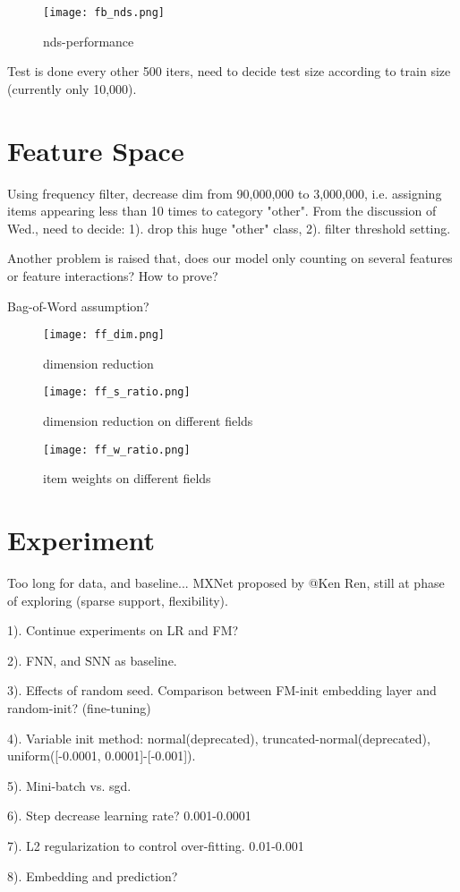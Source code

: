 \documentclass[
  oneside,
  11pt, a4paper,
  footinclude=false,
  headinclude=false,
]{scrbook}
\begin{document}
\begin{figure}[h]
    \centering
    \texttt{[image: fb\_nds.png]}
    \caption{nds-performance}
\end{figure}

Test is done every other 500 iters, need to decide test size according to train size (currently only 10,000). 

\section{Feature Space}

Using frequency filter, decrease dim from 90,000,000 to 3,000,000, i.e. assigning items appearing less than 10 times to category "other". From the discussion of Wed., need to decide: 1). drop this huge "other" class, 2). filter threshold setting.

Another problem is raised that, does our model only counting on several features or feature interactions? How to prove?

Bag-of-Word assumption? 

\begin{figure}[h]
    \centering
    \texttt{[image: ff\_dim.png]}
    \caption{dimension reduction}
\end{figure}

\begin{figure}[h]
    \centering
    \texttt{[image: ff\_s\_ratio.png]}
    \caption{dimension reduction on different fields}
\end{figure}

\begin{figure}[h]
    \centering
    \texttt{[image: ff\_w\_ratio.png]}
    \caption{item weights on different fields}
\end{figure}

\section{Experiment}

Too long for data, and baseline... MXNet proposed by @Ken Ren, still at phase of exploring (sparse support, flexibility).

1). Continue experiments on LR and FM?

2). FNN, and SNN as baseline.

3). Effects of random seed. Comparison between FM-init embedding layer and random-init? (fine-tuning)

4). Variable init method: normal(deprecated), truncated-normal(deprecated), uniform([-0.0001, 0.0001]-[-0.001]).

5). Mini-batch vs. sgd.

6). Step decrease learning rate? 0.001-0.0001

7). L2 regularization to control over-fitting. 0.01-0.001

8). Embedding and prediction?
\end{document}
